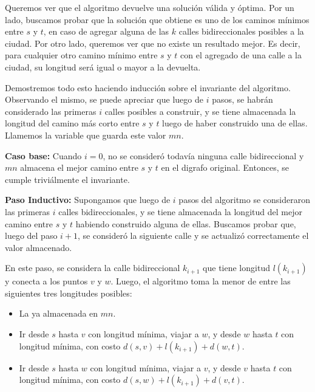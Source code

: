 Queremos ver que el algoritmo devuelve una solución válida y óptima. Por un lado, buscamos probar que la solución que obtiene es uno de los caminos mínimos entre $s$ y $t$, en caso de agregar alguna de las $k$ calles bidireccionales posibles a la ciudad. Por otro lado, queremos ver que no existe un resultado mejor. Es decir, para cualquier otro camino mínimo entre $s$ y $t$ con el agregado de una calle a la ciudad, su longitud será igual o mayor a la devuelta.

\vspace{1em}

Demostremos todo esto haciendo inducción sobre el invariante del algoritmo. Observando el mismo, se puede apreciar que luego de $i$ pasos, se habrán considerado las primeras $i$ calles posibles a construir, y se tiene almacenada la longitud del camino más corto entre $s$ y $t$ luego de haber construido una de ellas. Llamemos la variable que guarda este valor $mn$. 

\vspace{1em}

\textbf{Caso base:} Cuando $i = 0$, no se consideró todavía ninguna calle bidireccional y $mn$ almacena el mejor camino entre $s$ y $t$ en el digrafo original. Entonces, se cumple triviálmente el invariante.

\vspace{1em}

\textbf{Paso Inductivo:} Supongamos que luego de $i$ pasos del algoritmo se consideraron las primeras $i$ calles bidireccionales, y se tiene almacenada la longitud del mejor camino entre $s$ y $t$ habiendo construido alguna de ellas. Buscamos probar que, luego del paso $i+1$, se consideró la siguiente calle y se actualizó correctamente el valor almacenado.

\vspace{1em}

En este paso, se considera la calle bidireccional $k_{i+1}$ que tiene longitud $l(k_{i+1})$ y conecta a los puntos $v$ y $w$. Luego, el algoritmo toma la menor de entre las siguientes tres longitudes posibles:

\begin{itemize}
        \item La ya almacenada en $mn$.
        \item Ir desde $s$ hasta $v$ con longitud mínima, viajar a $w$, y desde $w$ hasta $t$ con longitud mínima, con costo $d(s,v) + l(k_{i+1}) + d(w,t)$.
        \item Ir desde $s$ hasta $w$ con longitud mínima, viajar a $v$, y desde $v$ hasta $t$ con longitud mínima, con costo $d(s,w) + l(k_{i+1}) + d(v,t)$.
\end{itemize}

